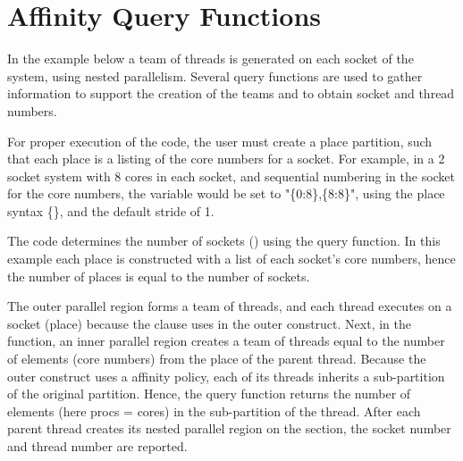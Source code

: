\section{Affinity Query Functions}
\label{sec: affinity_query}

In the example below a team of threads is generated on each socket of
the system, using nested parallelism. Several query functions are used
to gather information to support the creation of the teams and to obtain 
socket and thread numbers.

For proper execution of the code, the user must create a place partition, such that
each place is a listing of the core numbers for a socket. For example,
in a 2 socket system with 8 cores in each socket, and sequential numbering
in the socket for the core numbers, the  variable would be set
to "\{0:8\},\{8:8\}", using the place syntax \{\},
and the default stride of 1.

The code determines the number of sockets ()
using the  query function.
In this example each place is constructed with a list of 
each socket's core numbers, hence the number of places is equal
to the number of sockets. 

The outer parallel region forms a team of threads, and each thread 
executes on a socket (place) because the  clause uses 
 in the outer  construct.
Next, in the  function, an inner parallel region creates a team 
of threads equal to the number of elements (core numbers) from the place
of the parent thread. Because the outer  construct uses 
a  affinity policy, each of its threads inherits a sub-partition of 
the original partition.  Hence, the  query function
returns the number of elements (here procs = cores) in the sub-partition of the thread.  
After each parent thread creates its nested parallel region on the section,
the socket number and thread number are reported.

